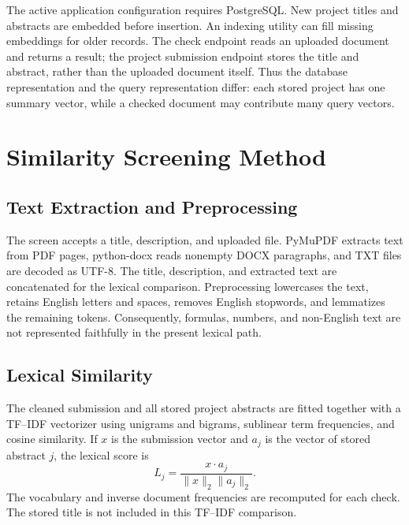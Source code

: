 \documentclass[conference]{IEEEtran}
\begin{document}
The active application configuration requires PostgreSQL. New project titles and abstracts are embedded before insertion. An indexing utility can fill missing embeddings for older records. The check endpoint reads an uploaded document and returns a result; the project submission endpoint stores the title and abstract, rather than the uploaded document itself. Thus the database representation and the query representation differ: each stored project has one summary vector, while a checked document may contribute many query vectors.

\section{Similarity Screening Method}
\subsection{Text Extraction and Preprocessing}
The screen accepts a title, description, and uploaded file. PyMuPDF extracts text from PDF pages, python-docx reads nonempty DOCX paragraphs, and TXT files are decoded as UTF-8. The title, description, and extracted text are concatenated for the lexical comparison. Preprocessing lowercases the text, retains English letters and spaces, removes English stopwords, and lemmatizes the remaining tokens. Consequently, formulas, numbers, and non-English text are not represented faithfully in the present lexical path.

\subsection{Lexical Similarity}
The cleaned submission and all stored project abstracts are fitted together with a TF--IDF vectorizer using unigrams and bigrams, sublinear term frequencies, and cosine similarity. If $x$ is the submission vector and $a_j$ is the vector of stored abstract $j$, the lexical score is
\begin{equation}
L_j = \frac{x\cdot a_j}{\lVert x\rVert_2\lVert a_j\rVert_2}.
\end{equation}
The vocabulary and inverse document frequencies are recomputed for each check. The stored title is not included in this TF--IDF comparison.
\end{document}
